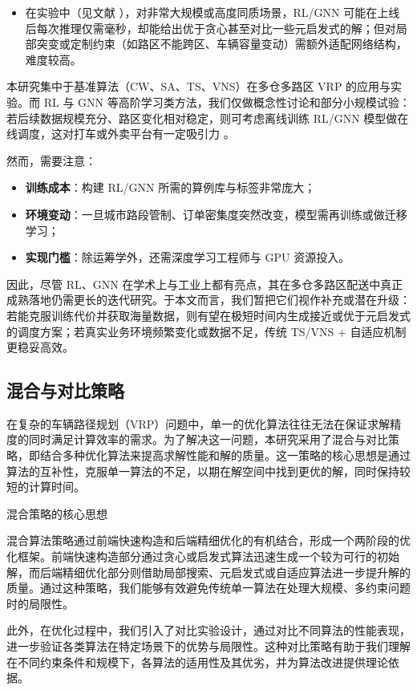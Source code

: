 \documentclass[12pt,a4paper,twoside]{ctexbook}
\begin{document}
    \begin{itemize}
        \item 在实验中（见文献 \cite{rl_performance,gnn_performance}），对非常大规模或高度同质场景，RL/GNN 可能在上线后每次推理仅需毫秒，却能给出优于贪心甚至对比一些元启发式的解；但对局部突变或定制约束（如路区不能跨区、车辆容量变动）需额外适配网络结构，难度较高。
    \end{itemize}
本研究集中于基准算法（CW、SA、TS、VNS）在多仓多路区 VRP 的应用与实验。而 RL 与 GNN 等高阶学习类方法，我们仅做概念性讨论和部分小规模试验：若后续数据规模充分、路区变化相对稳定，则可考虑离线训练 RL/GNN 模型做在线调度，这对打车或外卖平台有一定吸引力 \cite{gnn_rl_application}。

然而，需要注意：
\begin{itemize}
    \item \textbf{训练成本}：构建 RL/GNN 所需的算例库与标签非常庞大；
    \item \textbf{环境变动}：一旦城市路段管制、订单密集度突然改变，模型需再训练或做迁移学习；
    \item \textbf{实现门槛}：除运筹学外，还需深度学习工程师与 GPU 资源投入。
\end{itemize}

因此，尽管 RL、GNN 在学术上与工业上都有亮点，其在多仓多路区配送中真正成熟落地仍需更长的迭代研究。于本文而言，我们暂把它们视作补充或潜在升级：若能克服训练代价并获取海量数据，则有望在极短时间内生成接近或优于元启发式的调度方案；若真实业务环境频繁变化或数据不足，传统 TS/VNS + 自适应机制更稳妥高效。

\subsection{混合与对比策略}

在复杂的车辆路径规划（VRP）问题中，单一的优化算法往往无法在保证求解精度的同时满足计算效率的需求。为了解决这一问题，本研究采用了混合与对比策略，即结合多种优化算法来提高求解性能和解的质量。这一策略的核心思想是通过算法的互补性，克服单一算法的不足，以期在解空间中找到更优的解，同时保持较短的计算时间。

混合策略的核心思想

混合算法策略通过前端快速构造和后端精细优化的有机结合，形成一个两阶段的优化框架。前端快速构造部分通过贪心或启发式算法迅速生成一个较为可行的初始解，而后端精细优化部分则借助局部搜索、元启发式或自适应算法进一步提升解的质量。通过这种策略，我们能够有效避免传统单一算法在处理大规模、多约束问题时的局限性。

此外，在优化过程中，我们引入了对比实验设计，通过对比不同算法的性能表现，进一步验证各类算法在特定场景下的优势与局限性。这种对比策略有助于我们理解在不同约束条件和规模下，各算法的适用性及其优劣，并为算法改进提供理论依据。
\end{document}
